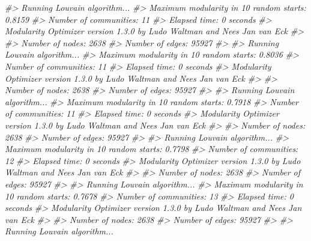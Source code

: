 \documentclass[
]{book}
\newenvironment{Shaded}{\begin{snugshade}}{\end{snugshade}}
\newcommand{\CommentTok}[1]{\textcolor[rgb]{0.56,0.35,0.01}{\textit{#1}}}
\begin{document}
\begin{Shaded}
\begin{Highlighting}[]
\CommentTok{\#\textgreater{} Running Louvain algorithm...}
\CommentTok{\#\textgreater{} Maximum modularity in 10 random starts: 0.8159}
\CommentTok{\#\textgreater{} Number of communities: 11}
\CommentTok{\#\textgreater{} Elapsed time: 0 seconds}
\CommentTok{\#\textgreater{} Modularity Optimizer version 1.3.0 by Ludo Waltman and Nees Jan van Eck}
\CommentTok{\#\textgreater{} }
\CommentTok{\#\textgreater{} Number of nodes: 2638}
\CommentTok{\#\textgreater{} Number of edges: 95927}
\CommentTok{\#\textgreater{} }
\CommentTok{\#\textgreater{} Running Louvain algorithm...}
\CommentTok{\#\textgreater{} Maximum modularity in 10 random starts: 0.8036}
\CommentTok{\#\textgreater{} Number of communities: 11}
\CommentTok{\#\textgreater{} Elapsed time: 0 seconds}
\CommentTok{\#\textgreater{} Modularity Optimizer version 1.3.0 by Ludo Waltman and Nees Jan van Eck}
\CommentTok{\#\textgreater{} }
\CommentTok{\#\textgreater{} Number of nodes: 2638}
\CommentTok{\#\textgreater{} Number of edges: 95927}
\CommentTok{\#\textgreater{} }
\CommentTok{\#\textgreater{} Running Louvain algorithm...}
\CommentTok{\#\textgreater{} Maximum modularity in 10 random starts: 0.7918}
\CommentTok{\#\textgreater{} Number of communities: 11}
\CommentTok{\#\textgreater{} Elapsed time: 0 seconds}
\CommentTok{\#\textgreater{} Modularity Optimizer version 1.3.0 by Ludo Waltman and Nees Jan van Eck}
\CommentTok{\#\textgreater{} }
\CommentTok{\#\textgreater{} Number of nodes: 2638}
\CommentTok{\#\textgreater{} Number of edges: 95927}
\CommentTok{\#\textgreater{} }
\CommentTok{\#\textgreater{} Running Louvain algorithm...}
\CommentTok{\#\textgreater{} Maximum modularity in 10 random starts: 0.7798}
\CommentTok{\#\textgreater{} Number of communities: 12}
\CommentTok{\#\textgreater{} Elapsed time: 0 seconds}
\CommentTok{\#\textgreater{} Modularity Optimizer version 1.3.0 by Ludo Waltman and Nees Jan van Eck}
\CommentTok{\#\textgreater{} }
\CommentTok{\#\textgreater{} Number of nodes: 2638}
\CommentTok{\#\textgreater{} Number of edges: 95927}
\CommentTok{\#\textgreater{} }
\CommentTok{\#\textgreater{} Running Louvain algorithm...}
\CommentTok{\#\textgreater{} Maximum modularity in 10 random starts: 0.7678}
\CommentTok{\#\textgreater{} Number of communities: 13}
\CommentTok{\#\textgreater{} Elapsed time: 0 seconds}
\CommentTok{\#\textgreater{} Modularity Optimizer version 1.3.0 by Ludo Waltman and Nees Jan van Eck}
\CommentTok{\#\textgreater{} }
\CommentTok{\#\textgreater{} Number of nodes: 2638}
\CommentTok{\#\textgreater{} Number of edges: 95927}
\CommentTok{\#\textgreater{} }
\CommentTok{\#\textgreater{} Running Louvain algorithm...}

\end{Highlighting}
\end{Shaded}
\end{document}
